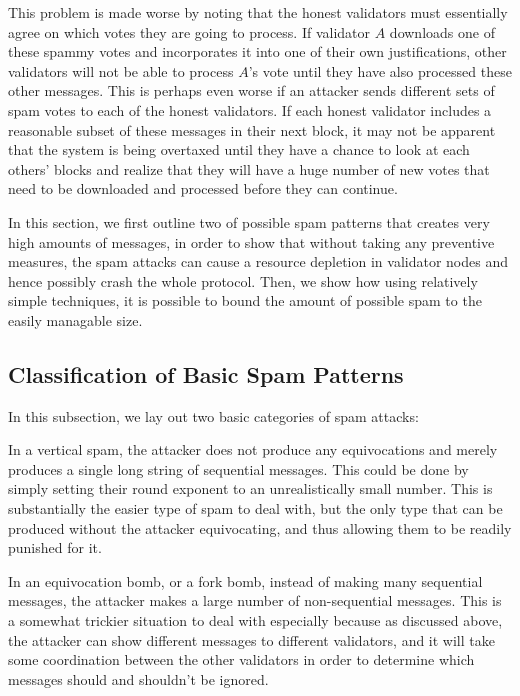\documentclass[12pt, fleqn]{article}
\begin{document}
This problem is made worse by noting that the honest validators must essentially agree on which votes they are going to process. If validator $A$ downloads one of these spammy votes and incorporates it into one of their own justifications, other validators will not be able to process $A$'s vote until they have also processed these other messages. This is perhaps even worse if an attacker sends different sets of spam votes to each of the honest validators. If each honest validator includes a reasonable subset of these messages in their next block, it may not be apparent that the system is being overtaxed until they have a chance to look at each others' blocks and realize that they will have a huge number of new votes that need to be downloaded and processed before they can continue.

In this section, we first outline two of possible spam patterns that creates very high amounts of messages, in order to show that without taking any preventive measures, the spam attacks can cause a resource depletion in validator nodes and hence possibly crash the whole protocol. Then, we show how using relatively simple techniques, it is possible to bound the amount of possible spam to the easily managable size. 

\subsection{Classification of Basic Spam Patterns}

In this subsection, we lay out two basic categories of spam attacks:

In a vertical spam, the attacker does not produce any equivocations and merely produces a single long string of sequential messages. This could be done by simply setting their round exponent to an unrealistically small number. This is substantially the easier type of spam to deal with, but the only type that can be produced without the attacker equivocating, and thus allowing them to be readily punished for it.

In an equivocation bomb, or a fork bomb\cite{gkagol2019aleph}, instead of making many sequential messages, the attacker makes a large number of non-sequential messages. This is a somewhat trickier situation to deal with especially because as discussed above, the attacker can show different messages to different validators, and it will take some coordination between the other validators in order to determine which messages should and shouldn't be ignored.
\end{document}

